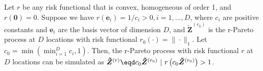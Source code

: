 \documentclass[12pt]{article}
\begin{document}
\begin{theorem}\label{thm:r_pareto_simulation}
Let $r$ be any risk functional that is convex, homogeneous of order 1, and $r(\bm 0)=0$. Suppose we have $r(\bm e_i)=1/c_i>0, i=1,\dots,D$, where $c_i$ are positive constants and $\bm e_i$ are the basis vector of dimension $D$, and $\bm{\tilde Z}^{(r_0)}$ is the r-Pareto process at $D$ locations with risk functional $r_0(\cdot)=\|\cdot\|_1$. Let $c_0 = \min(\min_{i=1}^D c_i,1)$. Then, the r-Pareto process with risk functional $r$ at $D$ locations can be simulated as $\bm{\tilde Z}^{(r)}\eqd c_0\bm{\tilde Z}^{(r_0)}\ | \ r\left(c_0\bm{\tilde Z}^{(r_0)}\right) > 1$.
\end{theorem}
\end{document}
